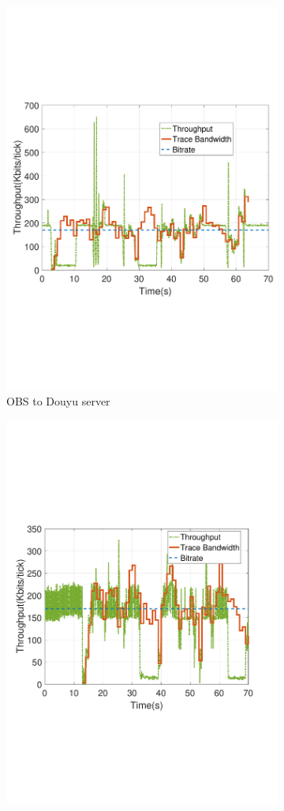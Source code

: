 \begin{figure}[htb]
\begin{subfigure}[b]{0.32\textwidth}
  \includegraphics[width=0.8\linewidth]{fig/obs_douyu.pdf}
  \vspace{-0.05in}    
  \caption{OBS to Douyu server}
  \label{fig:obs-douyu}
\end{subfigure}
\begin{subfigure}[b]{0.32\textwidth}
  \includegraphics[width=0.8\linewidth]{fig/douyu.pdf}

\end{subfigure}
\end{figure}
